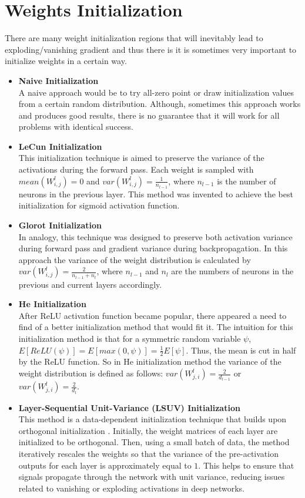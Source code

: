 \section{Weights Initialization}
There are many weight initialization regions that will inevitably lead to exploding/vanishing gradient and thus there is it is sometimes very important to initialize weights in a certain way. \autocite{sun2020optimization}
\begin{itemize}
  \item \textbf{Naive Initialization} \\
    A naive approach would be to try all-zero point or draw initialization values from a certain random distribution. Although, sometimes this approach works and produces good results, there is no guarantee that it will work for all problems with identical success.
  \item \textbf{LeCun Initialization} \autocite{LeCun1998} \\
    This initialization technique is aimed to preserve the variance of the activations during the forward pass. Each weight is sampled with $mean(W_{i,j}^l) = 0$ and $var(W_{i,j}^l) = \frac{1}{n_{l-1}}$, where $n_{l-1}$ is the number of neurons in the previous layer. This method was invented to achieve the best initialization for sigmoid activation function.
  \item \textbf{Glorot Initialization} \autocite{glorot2010understanding} \\
    In analogy, this technique was designed to preserve both activation variance during forward pass and gradient variance during backpropagation. In this approach the variance of the weight distribution is calculated by $var(W_{i,j}^l) = \frac{2}{n_{l-1} + n_{l}}$, where $n_{l-1}$ and $n_{l}$ are the numbers of neurons in the previous and current layers accordingly.
  \item \textbf{He Initialization} \autocite{he2015delving} \\
    After ReLU activation function became popular, there appeared a need to find of a better initialization method that would fit it. The intuition for this initialization method is that for a symmetric random variable $\psi$, $ E[ReLU(\psi)] = E[max(0, \psi)] = \frac{1}{2} E[\psi] $. Thus, the mean is cut in half by the ReLU function. So in He initialization method the variance of the weight distribution is defined as follows: $var(W_{j,i}^l) = \frac{2}{d_{l-1}}$ or $var(W_{j,i}^l) = \frac{2}{d_l}$.
  \item \textbf{Layer-Sequential Unit-Variance (LSUV) Initialization} \autocite{mishkin2015all} \\
    This method is a data-dependent initialization technique that builds upon orthogonal initialization \autocite{saxe2013exact}. Initially, the weight matrices of each layer are initialized to be orthogonal. Then, using a small batch of data, the method iteratively rescales the weights so that the variance of the pre-activation outputs for each layer is approximately equal to $1$. This helps to ensure that signals propagate through the network with unit variance, reducing issues related to vanishing or exploding activations in deep networks.
\end{itemize}


